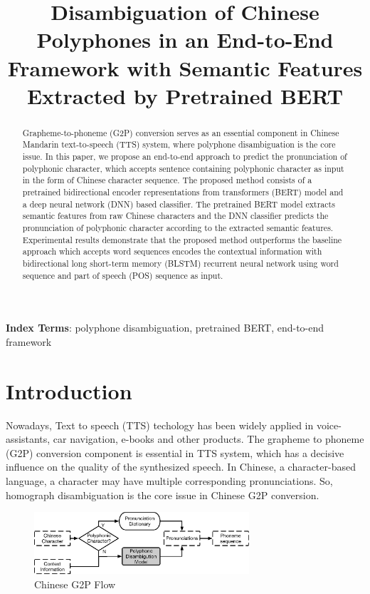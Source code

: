 \documentclass[a4paper]{article}
\title{Disambiguation of Chinese Polyphones in an End-to-End Framework with Semantic Features Extracted by Pretrained BERT}
\begin{document}
\maketitle
% 
\begin{abstract}
  Grapheme-to-phoneme (G2P) conversion serves as an essential component in Chinese Mandarin text-to-speech (TTS) system, where polyphone disambiguation is the core issue. In this paper, we propose an end-to-end approach to predict the pronunciation of polyphonic character, which accepts sentence containing polyphonic character as input in the form of Chinese character sequence. The proposed method consists of a pretrained bidirectional encoder representations from transformers (BERT) model and a deep neural network (DNN) based classifier. The pretrained BERT model extracts semantic features from raw Chinese characters and the DNN classifier predicts the pronunciation of polyphonic character according to the extracted semantic features. Experimental results demonstrate that the proposed method outperforms the baseline approach which accepts word sequences encodes the contextual information with bidirectional long short-term memory (BLSTM) recurrent neural network using word sequence and part of speech (POS) sequence as input.
\end{abstract}

\noindent\textbf{Index Terms}: polyphone disambiguation, pretrained BERT, end-to-end framework

\section{Introduction}


Nowadays, Text to speech (TTS) techology has been widely applied in voice-assistants, car navigation, e-books and other products. The grapheme to phoneme (G2P) conversion component is essential in TTS system, which has a decisive influence on the quality of the synthesized speech. In Chinese, a character-based language, a character may have multiple corresponding pronunciations. So, homograph disambiguation is the core issue in Chinese G2P conversion.

\begin{figure}[htb]
	
	\begin{minipage}[b]{1.0\linewidth}
		\centerline{\includegraphics[width=8cm]{pics/ChineseG2P.eps}}
	\end{minipage}
	\caption{Chinese G2P Flow}
	\label{fig:model-framework}
\end{figure}
\end{document}
